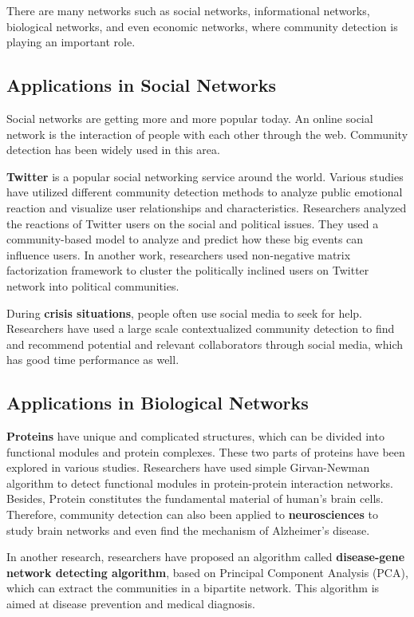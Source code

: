\documentclass[11pt]{article}
\begin{document}
\noindent There are many networks such as social networks, informational networks, biological networks, and even
economic networks, where community detection is playing an important role.

\subsection{Applications in Social Networks}
Social networks are getting more and more popular today. An online social network is the interaction of people with each other through the web. Community detection has been widely used in this area.

\noindent \textbf{Twitter} is a popular social networking service around the world. Various studies have utilized different community detection methods to analyze public emotional reaction and visualize user relationships and characteristics. 
Researchers analyzed the reactions of Twitter users on the social and political issues. They used a community-based model to analyze and predict how these big events can influence users.\cite{twitter2009}
In another work, researchers used non-negative matrix factorization framework to cluster the politically inclined users on Twitter network into political communities.\cite{twitter2016}

\noindent During \textbf{crisis situations}, people often use social media to seek for help. Researchers have used a large scale contextualized community detection to find and recommend potential and relevant collaborators through social media, which has good time performance as well.\cite{crisis2015}

\subsection{Applications in Biological Networks} 

\textbf{Proteins} have unique and complicated structures, which can be divided into functional modules and protein complexes.\cite{chen2014} These two parts of proteins have been explored in various studies. Researchers have used simple Girvan-Newman algorithm to detect functional modules in protein-protein interaction networks.\cite{protein2005}
Besides, Protein constitutes the fundamental material of human's brain cells. Therefore, community detection can also been applied to \textbf{neurosciences} to study brain networks and even find the mechanism of Alzheimer's disease.\cite{neuro2017}

\noindent In another research, researchers have proposed an algorithm called \textbf{disease-gene network detecting algorithm}, based on Principal Component Analysis (PCA), 
which can extract the communities in a bipartite network.\cite{disease2013} This algorithm is aimed at disease prevention and medical diagnosis.
\end{document}
